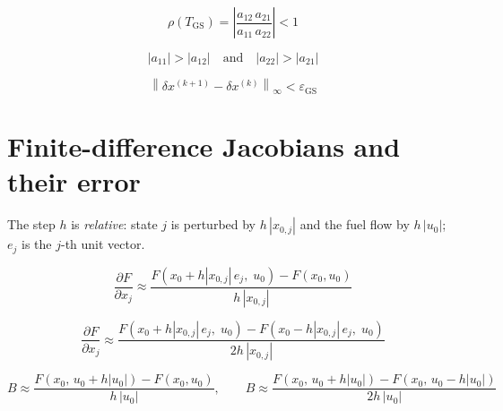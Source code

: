 \documentclass[11pt,a4paper]{article}
\begin{document}
\begin{equation}
  \rho(T_{\mathrm{GS}}) = \left| \frac{a_{12}\,a_{21}}{a_{11}\,a_{22}} \right| < 1
  \label{eq:gs-radius}
\end{equation}

\begin{equation}
  |a_{11}| > |a_{12}| \quad\text{and}\quad |a_{22}| > |a_{21}|
  \label{eq:diag-dominance}
\end{equation}

\begin{equation}
  \left\| \delta x^{(k+1)} - \delta x^{(k)} \right\|_{\infty} < \varepsilon_{\mathrm{GS}}
  \label{eq:gs-stop}
\end{equation}

\section{Finite-difference Jacobians and their error}
The step $h$ is \emph{relative}: state $j$ is perturbed by $h\,|x_{0,j}|$ and the fuel
flow by $h\,|u_0|$; $e_j$ is the $j$-th unit vector.

\begin{equation}
  \frac{\partial F}{\partial x_j} \approx
  \frac{F\!\left(x_0 + h|x_{0,j}|\,e_j,\;u_0\right) - F\!\left(x_0,u_0\right)}{h\,|x_{0,j}|}
  \label{eq:fd-forward}
\end{equation}

\begin{equation}
  \frac{\partial F}{\partial x_j} \approx
  \frac{F\!\left(x_0 + h|x_{0,j}|\,e_j,\;u_0\right) - F\!\left(x_0 - h|x_{0,j}|\,e_j,\;u_0\right)}{2h\,|x_{0,j}|}
  \label{eq:fd-central}
\end{equation}

\begin{equation}
  B \approx \frac{F\!\left(x_0,\,u_0 + h|u_0|\right) - F\!\left(x_0,u_0\right)}{h\,|u_0|},
  \qquad
  B \approx \frac{F\!\left(x_0,\,u_0 + h|u_0|\right) - F\!\left(x_0,\,u_0 - h|u_0|\right)}{2h\,|u_0|}
  \label{eq:fd-b}
\end{equation}
\end{document}
